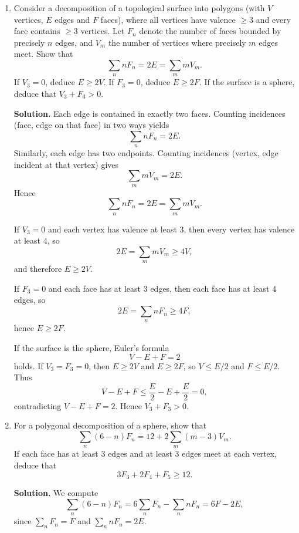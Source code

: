 \documentclass[12pt,a4paper]{article}
\theoremstyle{plain}
\theoremstyle{definition}      %
\begin{document}
\begin{enumerate}[label=\textnormal{(\alph*)}]
	
	\item 
	Consider a decomposition of a topological surface into polygons
	(with $V$ vertices, $E$ edges and $F$ faces), where all vertices
	have valence $\ge 3$ and every face contains $\ge 3$ vertices.
	Let $F_{n}$ denote the number of faces bounded by precisely $n$ edges,
	and $V_{m}$ the number of vertices where precisely $m$ edges meet.
	Show that
	\[
	\sum_{n} n F_{n} = 2E = \sum_{m} m V_{m}.
	\]
	If $V_{3} = 0$, deduce $E \ge 2V$.
	If $F_{3} = 0$, deduce $E \ge 2F$.
	If the surface is a sphere, deduce that $V_{3} + F_{3} > 0$.
	
	\medskip
	\textbf{Solution.}
	Each edge is contained in exactly two faces.  
	Counting incidences (face, edge on that face) in two ways yields
	\[
	\sum_n nF_n = 2E.
	\]
	Similarly, each edge has two endpoints.  Counting incidences
	(vertex, edge incident at that vertex) gives
	\[
	\sum_m mV_m = 2E.
	\]
	Hence
	\[
	\sum_n nF_n = 2E = \sum_m mV_m.
	\]
	
	If $V_3 = 0$ and each vertex has valence at least $3$, then every vertex
	has valence at least $4$, so
	\[
	2E = \sum_m mV_m \ge 4V,
	\]
	and therefore $E \ge 2V$.
	
	If $F_3 = 0$ and each face has at least $3$ edges, then each face has at least
	$4$ edges, so
	\[
	2E = \sum_n nF_n \ge 4F,
	\]
	hence $E \ge 2F$.
	
	If the surface is the sphere, Euler’s formula
	\[
	V - E + F = 2
	\]
	holds. If $V_3 = F_3 = 0$, then $E \ge 2V$ and $E \ge 2F$, so
	$V \le E/2$ and $F \le E/2$. Thus
	\[
	V - E + F \le \frac{E}{2} - E + \frac{E}{2} = 0,
	\]
	contradicting $V - E + F = 2$.  
	Hence $V_3 + F_3 > 0$.
	
	\item
	For a polygonal decomposition of a sphere, show that
	\[
	\sum_{n} (6-n) F_{n}
	= 12 + 2 \sum_{m} (m-3) V_{m}.
	\]
	If each face has at least $3$ edges and at least $3$ edges meet
	at each vertex, deduce that
	\[
	3F_{3} + 2F_{4} + F_{5} \ge 12.
	\]
	
	\medskip
	\textbf{Solution.}
	We compute
	\[
	\sum_n (6-n)F_n
	= 6\sum_n F_n - \sum_n nF_n
	= 6F - 2E,
	\]
	since $\sum_n F_n = F$ and $\sum_n nF_n = 2E$.
	

\end{enumerate}
\end{document}

